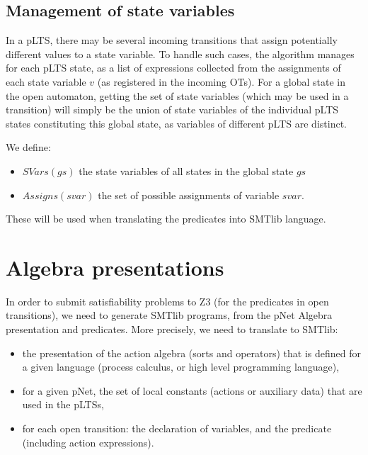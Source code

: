 \documentclass{lncs/llncs}
\begin{document}
\subsection{Management of state variables}
\label{appendix:translating-assignments}
In a pLTS, there may be several incoming transitions 
that assign potentially different values to a state variable.
To handle such cases, the algorithm manages for each pLTS state, as a
list of expressions collected from the assignments of each state
variable $v$ (as registered in the incoming OTs).
For a global state in the open automaton, getting the set of state
variables (which may be used in a transition) will simply be the union
of state variables of the individual pLTS states constituting this
global state, as variables of different pLTS are distinct.

 We define:
\begin{itemize}
  \item $SVars(gs)$ the state variables of all states in the global
    state $gs$
  \item $Assigns(svar)$ the set of possible assignments of variable
      $svar$.
\end{itemize}
These will be used when translating the predicates into SMTlib
language.


\section{Algebra presentations}
\label{appendix:algpresentations}
In order to submit satisfiability problems to Z3 (for the predicates
in open transitions), we need to generate SMTlib programs, from the
pNet Algebra presentation and predicates.
More precisely, we need to translate to SMTlib:
\begin{itemize}
  \item the presentation of the action algebra
    (sorts and operators) that is defined for a given language (process calculus, or high level programming language),
    \item for a given pNet, the set of local constants (actions or auxiliary data) that are used in the pLTSs,
    \item for each open transition: the declaration of variables, and
      the predicate (including action expressions).
\end{itemize}
\end{document}
